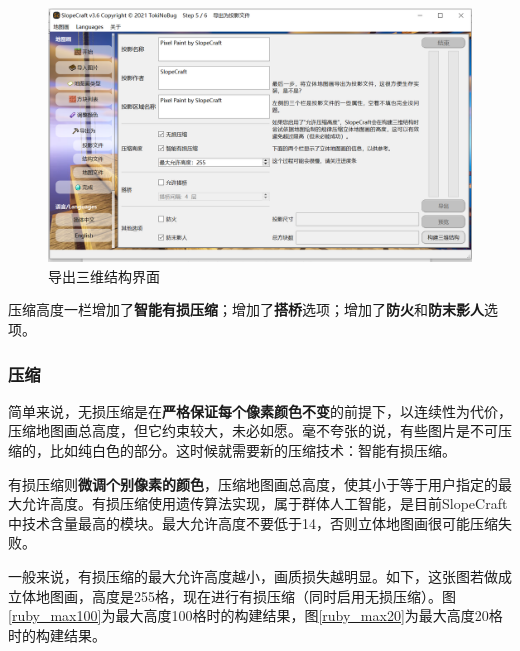 \documentclass[UTF8]{ctexart}
\begin{document}
    \begin{figure}[htbp]
        \centering
        \includegraphics[width=15cm]{Img2_Export3D.png}
        \caption{导出三维结构界面}
    \end{figure}

    压缩高度一栏增加了\textbf{智能有损压缩}；增加了\textbf{搭桥}选项；增加了\textbf{防火}和\textbf{防末影人}选项。 
        
    \subsubsection{压缩}
    简单来说，无损压缩是在\textbf{严格保证每个像素颜色不变}的前提下，以连续性为代价，压缩地图画总高度，但它约束较大，未必如愿。毫不夸张的说，有些图片是不可压缩的，比如纯白色的部分。这时候就需要新的压缩技术：智能有损压缩。

    有损压缩则\textbf{微调个别像素的颜色}，压缩地图画总高度，使其小于等于用户指定的最大允许高度。有损压缩使用遗传算法实现，属于群体人工智能，是目前SlopeCraft中技术含量最高的模块。最大允许高度不要低于14，否则立体地图画很可能压缩失败。

    一般来说，有损压缩的最大允许高度越小，画质损失越明显。如下，这张图若做成立体地图画，高度是255格，现在进行有损压缩（同时启用无损压缩）。图\ref*{ruby_max100}为最大高度100格时的构建结果，图\ref*{ruby_max20}为最大高度20格时的构建结果。
\end{document}
